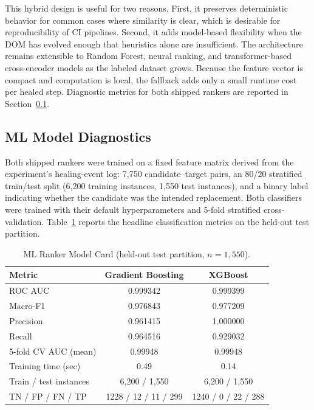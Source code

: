 \documentclass[conference]{IEEEtran}
\begin{document}
This hybrid design is useful for two reasons. First, it preserves deterministic behavior for common cases where similarity is clear, which is desirable for reproducibility of CI pipelines. Second, it adds model-based flexibility when the DOM has evolved enough that heuristics alone are insufficient. The architecture remains extensible to Random Forest, neural ranking, and transformer-based cross-encoder models as the labeled dataset grows. Because the feature vector is compact and computation is local, the fallback adds only a small runtime cost per healed step. Diagnostic metrics for both shipped rankers are reported in Section~\ref{sec:model_diagnostics}.

\subsection{ML Model Diagnostics}
\label{sec:model_diagnostics}

Both shipped rankers were trained on a fixed feature matrix derived from the experiment's healing-event log: 7{,}750 candidate--target pairs, an 80/20 stratified train/test split (6{,}200 training instances, 1{,}550 test instances), and a binary label indicating whether the candidate was the intended replacement. Both classifiers were trained with their default hyperparameters and 5-fold stratified cross-validation. Table~\ref{tab:model_card} reports the headline classification metrics on the held-out test partition.

\begin{table}[H]
\centering
\caption{ML Ranker Model Card (held-out test partition, $n=1{,}550$).}
\label{tab:model_card}
\begin{tabular}{lcc}
\toprule
\textbf{Metric} & \textbf{Gradient Boosting} & \textbf{XGBoost} \\
\midrule
ROC AUC                 & 0.999342 & 0.999399 \\
Macro-F1                & 0.976843 & 0.977209 \\
Precision               & 0.961415 & 1.000000 \\
Recall                  & 0.964516 & 0.929032 \\
5-fold CV AUC (mean)    & 0.99948  & 0.99948  \\
Training time (sec)     & 0.49     & 0.14     \\
Train / test instances  & 6{,}200 / 1{,}550 & 6{,}200 / 1{,}550 \\
\midrule
TN / FP / FN / TP       & 1228 / 12 / 11 / 299 & 1240 / 0 / 22 / 288 \\
\bottomrule
\end{tabular}
\end{table}
\end{document}
